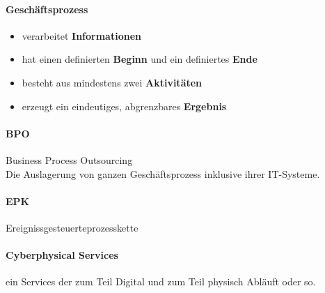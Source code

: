 \documentclass[twocolumn]{article}
\begin{document}
\paragraph{Geschäftsprozess}
	\begin{itemize}
		\item verarbeitet \textbf{Informationen} 
		\item hat einen definierten \textbf{Beginn}  und ein definiertes \textbf {Ende}
		\item besteht aus mindestens zwei \textbf{Aktivitäten}
		\item erzeugt ein eindeutiges, abgrenzbares \textbf{Ergebnis}
	\end{itemize}

\paragraph{BPO}
	Business Process Outsourcing \\
	Die Auslagerung von ganzen Geschäftsprozess inklusive ihrer IT-Systeme.

\paragraph{EPK} Ereignissgesteuerteprozesskette \\

\paragraph{Cyberphysical Services} ein Services der zum Teil Digital und zum Teil physisch Abläuft oder so.
\end{document}
